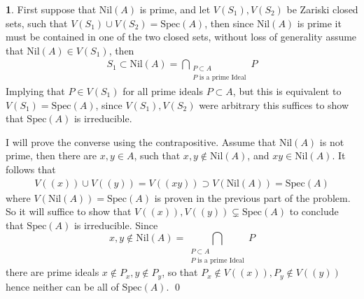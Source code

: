 \documentclass[11pt]{article}
\theoremstyle{definition}
\newtheorem{pb}{}
\newcommand{\spec}{\text{Spec}}
\newcommand{\nil}{\text{Nil}}
\begin{document}
    \begin{pb}
        First suppose that \(\nil(A)\) is prime, and let \(V(S_1), V(S_2)\) be Zariski closed sets, such that \(V(S_1) \cup V(S_2) = \spec(A)\), then since \(\nil(A)\) is prime it must be contained in one of the two closed sets, without loss of generality assume that \(\nil(A) \in V(S_1)\), then
        \begin{align*}
            S_1 \subset \nil(A) = \bigcap_{\substack{P \subset A \\ P \text{ is a prime Ideal}}} P
        \end{align*}
        Implying that \(P \in V(S_1)\) for all prime ideals \(P \subset A\), but this is equivalent to \(V(S_1) = \spec(A)\), since \(V(S_1),V(S_2)\) were arbitrary this suffices to show that \(\spec(A)\) is irreducible.

        I will prove the converse using the contrapositive. Assume that \(\nil(A)\) is not prime, then there are \(x,y \in A\), such that \(x,y \not \in \text{Nil}(A)\), and \(xy \in \nil(A)\). It follows that
        \begin{align*}
            V((x))\cup V((y)) = V((xy)) \supset V(\nil(A)) = \spec(A)
        \end{align*}
        where \(V(\nil(A)) = \spec(A)\) is proven in the previous part of the problem. So it will suffice to show that \(V((x)), V((y)) \subsetneq \spec(A)\) to conclude that \(\spec(A)\) is irreducible. Since \[x,y \not \in \nil(A) = \bigcap_{\substack{P \subset A \\ P \text{ is a prime Ideal}}} P\]
        there are prime ideals \(x \not \in P_x, y \not \in P_y\), so that \(P_x \not \in V((x)), P_y \not \in V((y))\) hence neither can be all of \(\spec(A)\). \qed
    \end{pb}
\end{document}
